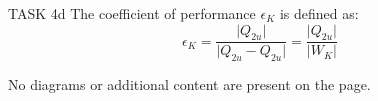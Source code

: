 TASK 4d  
The coefficient of performance \( \epsilon_K \) is defined as:  
\[
\epsilon_K = \frac{\lvert Q_{2u} \rvert}{\lvert Q_{2u} - Q_{2u} \rvert} = \frac{\lvert Q_{2u} \rvert}{\lvert W_{K} \rvert}
\]  

No diagrams or additional content are present on the page.